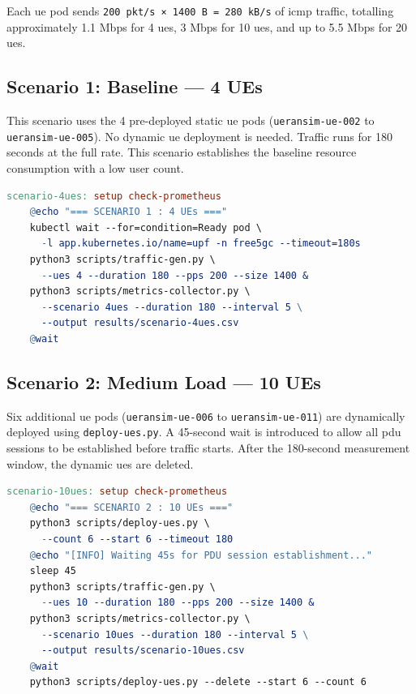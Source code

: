Each \gls{ue} pod sends \texttt{200 pkt/s × 1400 B = 280 kB/s} of \gls{icmp} traffic, totalling approximately 1.1 Mbps for 4 \glspl{ue}, 3 Mbps for 10 \glspl{ue}, and up to 5.5 Mbps for 20 \glspl{ue}.

\subsection{Scenario 1: Baseline — 4 UEs}

This scenario uses the 4 pre-deployed static \gls{ue} pods (\texttt{ueransim-ue-002} to \texttt{ueransim-ue-005}). No dynamic \gls{ue} deployment is needed. Traffic runs for 180 seconds at the full rate. This scenario establishes the baseline resource consumption with a low user count.

\begin{lstlisting}[language=make, caption={Makefile target for the 4-UE scenario}, label={lst:scenario_4ues}]
scenario-4ues: setup check-prometheus
    @echo "=== SCENARIO 1 : 4 UEs ==="
    kubectl wait --for=condition=Ready pod \
      -l app.kubernetes.io/name=upf -n free5gc --timeout=180s
    python3 scripts/traffic-gen.py \
      --ues 4 --duration 180 --pps 200 --size 1400 &
    python3 scripts/metrics-collector.py \
      --scenario 4ues --duration 180 --interval 5 \
      --output results/scenario-4ues.csv
    @wait
\end{lstlisting}

\subsection{Scenario 2: Medium Load — 10 UEs}

Six additional \gls{ue} pods (\texttt{ueransim-ue-006} to \texttt{ueransim-ue-011}) are dynamically deployed using \texttt{deploy-ues.py}. A 45-second wait is introduced to allow all \gls{pdu} sessions to be established before traffic starts. After the 180-second measurement window, the dynamic \glspl{ue} are deleted.

\begin{lstlisting}[language=make, caption={Makefile target for the 10-UE scenario}, label={lst:scenario_10ues}]
scenario-10ues: setup check-prometheus
    @echo "=== SCENARIO 2 : 10 UEs ==="
    python3 scripts/deploy-ues.py \
      --count 6 --start 6 --timeout 180
    @echo "[INFO] Waiting 45s for PDU session establishment..."
    sleep 45
    python3 scripts/traffic-gen.py \
      --ues 10 --duration 180 --pps 200 --size 1400 &
    python3 scripts/metrics-collector.py \
      --scenario 10ues --duration 180 --interval 5 \
      --output results/scenario-10ues.csv
    @wait
    python3 scripts/deploy-ues.py --delete --start 6 --count 6
\end{lstlisting}

